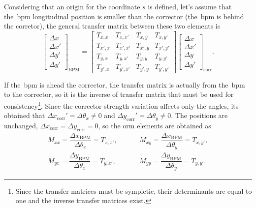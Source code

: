 Considering that an origin for the coordinate $s$ is defined, let's assume that the~\gls{bpm} longitudinal position is smaller than the corrector (the~\gls{bpm} is behind the corretor), the general transfer matrix between these two elements is
\begin{equation}
    \begin{bmatrix}
    \Delta x \\
    \Delta x' \\
    \Delta y' \\
    \Delta y'
    \end{bmatrix}_{\mathrm{BPM}}  =
    \begin{bmatrix}
    T_{x, x} & T_{x, x'} & T_{x, y} & T_{x, y'} \\
    T_{x', x} & T_{x', x'} & T_{x', y} & T_{x', y'} \\
    T_{y, x} & T_{y, x'} & T_{y, y} & T_{y, y'} \\
    T_{y', x} & T_{y', x'} & T_{y', y} & T_{y', y'} 
    \end{bmatrix} 
    \begin{bmatrix}
    \Delta x \\
    \Delta x' \\
    \Delta y \\
    \Delta y'
    \end{bmatrix}_{\mathrm{corr}}.
\end{equation}

If the~\gls{bpm} is ahead the corrector, the transfer matrix is actually from the~\gls{bpm} to the corrector, so it is the inverse of transfer matrix that must be used for consistency\footnote{Since the transfer matrices must be sympletic, their determinants are equal to one and the inverse transfer matrices exist.}. Since the corrector strength variation affects only the angles, its obtained that  $\Delta x_{\mathrm{corr}}' = \Delta \theta_x \neq 0$ and $\Delta y_{\mathrm{corr}}' = \Delta \theta_y \neq 0$. The positions are unchanged, $\Delta x_{\mathrm{corr}} = \Delta y_{\mathrm{corr}} = 0$, so the \gls{orm} elements are obtained as 
\begin{align*}
    M_{xx} = \dfrac{\Delta x_{\mathrm{BPM}}}{\Delta \theta_x} = T_{x, x'}, & \hspace{1cm} M_{xy} = \dfrac{\Delta x_{\mathrm{BPM}}}{\Delta \theta_y} = T_{x, y'}, \\
    M_{yx} = \dfrac{\Delta y_{\mathrm{BPM}}}{\Delta \theta_x} = T_{y, x'}, & \hspace{1cm} M_{yy} = \dfrac{\Delta y_{\mathrm{BPM}}}{\Delta \theta_y} = T_{y, y'}.
\end{align*}

